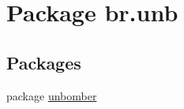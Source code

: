 \hypertarget{namespacebr_1_1unb}{\section{Package br.\+unb}
\label{namespacebr_1_1unb}
}
\subsection*{Packages}
\begin{DoxyCompactItemize}
\item 
package \hyperlink{namespacebr_1_1unb_1_1unbomber}{unbomber}
\end{DoxyCompactItemize}
